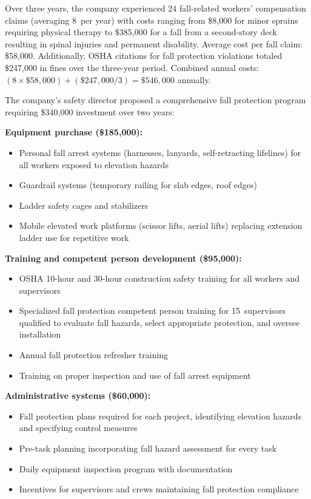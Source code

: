 \documentclass[11pt,openany]{book}
\providecommand{\tightlist}{\setlength{\itemsep}{0pt}\setlength{\parskip}{0pt}}
\begin{document}
Over three years, the company experienced 24 fall-related workers'
compensation claims (averaging 8~per year) with costs ranging from \$8{,}000
for minor sprains requiring physical therapy to \$385{,}000 for a fall from a
second-story deck resulting in spinal injuries and permanent disability.
Average cost per fall claim: \$58{,}000. Additionally, OSHA citations for fall
protection violations totaled \$247{,}000 in fines over the three-year period.
Combined annual costs: \((8 \times \$58{,}000) + (\$247{,}000 / 3) =
\$546{,}000\) annually.

The company's safety director proposed a comprehensive fall protection program
requiring \$340{,}000 investment over two years:

\textbf{Equipment purchase (\$185{,}000):}
\begin{itemize}\tightlist
  \item Personal fall arrest systems (harnesses, lanyards, self-retracting
        lifelines) for all workers exposed to elevation hazards
  \item Guardrail systems (temporary railing for slab edges, roof edges)
  \item Ladder safety cages and stabilizers
  \item Mobile elevated work platforms (scissor lifts, aerial lifts) replacing
        extension ladder use for repetitive work
\end{itemize}

\textbf{Training and competent person development (\$95{,}000):}
\begin{itemize}\tightlist
  \item OSHA 10-hour and 30-hour construction safety training for all workers
        and supervisors
  \item Specialized fall protection competent person training for
        15~supervisors qualified to evaluate fall hazards, select appropriate
        protection, and oversee installation
  \item Annual fall protection refresher training
  \item Training on proper inspection and use of fall arrest equipment
\end{itemize}

\textbf{Administrative systems (\$60{,}000):}
\begin{itemize}\tightlist
  \item Fall protection plans required for each project, identifying elevation
        hazards and specifying control measures
  \item Pre-task planning incorporating fall hazard assessment for every task
  \item Daily equipment inspection program with documentation
  \item Incentives for supervisors and crews maintaining fall protection
        compliance
\end{itemize}
\end{document}
